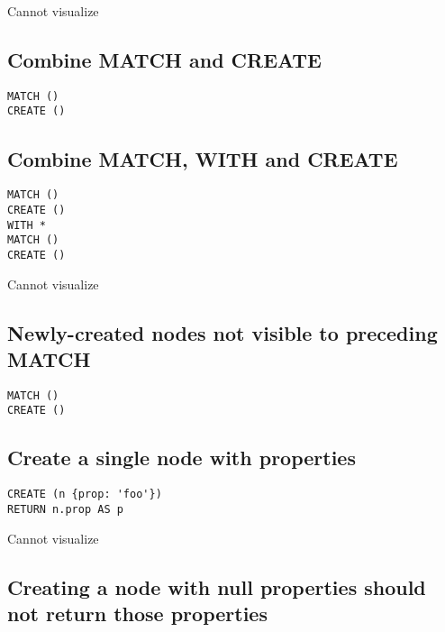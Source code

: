 Cannot visualize
\subsection{Combine MATCH and CREATE}

\begin{lstlisting}
MATCH ()
CREATE ()
\end{lstlisting}

\subsection{Combine MATCH, WITH and CREATE}

\begin{lstlisting}
MATCH ()
CREATE ()
WITH *
MATCH ()
CREATE ()
\end{lstlisting}

Cannot visualize
\subsection{Newly-created nodes not visible to preceding MATCH}

\begin{lstlisting}
MATCH ()
CREATE ()
\end{lstlisting}

\subsection{Create a single node with properties}

\begin{lstlisting}
CREATE (n {prop: 'foo'})
RETURN n.prop AS p
\end{lstlisting}

Cannot visualize
\subsection{Creating a node with null properties should not return those properties}


